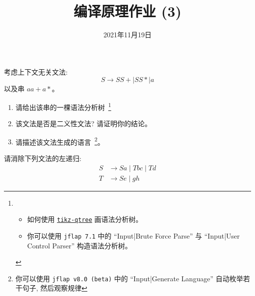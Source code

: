 \documentclass[a4paper, justified]{tufte-handout}
\title{编译原理作业 (3)}
\date{2021年11月19日}
\begin{document}
\maketitle
\noplagiarism %
\begin{abstract}
\end{abstract}
\beginrequired

\begin{problem}[\score{10 = 4 + 4 + 2}]
  考虑上下文无关文法:
  \[
    S \to S S + \mid S S \ast \mid a
  \]
  以及串 $a a + a \ast$。

  \begin{enumerate}[(1)]
    \item 请给出该串的一棵语法分析树~\footnote{
      \begin{itemize}
        \item 如何使用 \href{https://mirrors.hit.edu.cn/CTAN/graphics/pgf/contrib/tikz-qtree/tikz-qtree-manual.pdf}{\texttt{tikz-qtree}} 画语法分析树。
        \item 你可以使用 \texttt{jflap 7.1} 中的 ``Input|Brute Force Parse'' 与 ``Input|User Control Parser'' 构造语法分析树。
      \end{itemize}}
    \item 该文法是否是二义性文法? 请证明你的结论。
    \item 请描述该文法生成的语言~\footnote{你可以使用 \texttt{jflap v8.0 (beta)} 中的 ``Input|Generate Language'' 自动枚举若干句子, 然后观察规律}。
  \end{enumerate}
\end{problem}

\begin{solution}
\end{solution}

\begin{problem}[\score{10}]
  请消除下列文法的左递归:
  \begin{align*}
    S &\to Sa \mid Tbc \mid Td \\[8pt]
    T &\to Se \mid gh
  \end{align*}
\end{problem}
\end{document}
